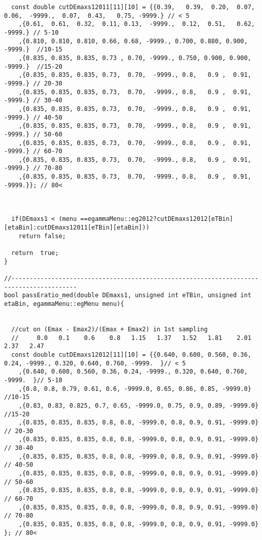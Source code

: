 \begin{lstlisting}
  const double cutDEmaxs12011[11][10] = {{0.39,   0.39,  0.20,  0.07, 0.06,  -9999.,  0.07,  0.43,   0.75, -9999.} // < 5  
	,{0.61,  0.61,  0.32,  0.11, 0.13,  -9999.,  0.12,  0.51,   0.62, -9999.} // 5-10
	,{0.810, 0.810, 0.810, 0.66, 0.68, -9999., 0.700, 0.880, 0.900, -9999.}  //10-15 
	,{0.835, 0.835, 0.835, 0.73 , 0.70, -9999., 0.750, 0.900, 0.900, -9999.}  //15-20 
	,{0.835, 0.835, 0.835, 0.73,  0.70,  -9999., 0.8,   0.9 ,  0.91,  -9999.} // 20-30 
	,{0.835, 0.835, 0.835, 0.73,  0.70,  -9999., 0.8,   0.9 ,  0.91,  -9999.} // 30-40
	,{0.835, 0.835, 0.835, 0.73,  0.70,  -9999., 0.8,   0.9 ,  0.91,  -9999.} // 40-50
	,{0.835, 0.835, 0.835, 0.73,  0.70,  -9999., 0.8,   0.9 ,  0.91,  -9999.} // 50-60 
	,{0.835, 0.835, 0.835, 0.73,  0.70,  -9999., 0.8,   0.9 ,  0.91,  -9999.} // 60-70
	,{0.835, 0.835, 0.835, 0.73,  0.70,  -9999., 0.8,   0.9 ,  0.91,  -9999.} // 70-80
	,{0.835, 0.835, 0.835, 0.73,  0.70,  -9999., 0.8,   0.9 ,  0.91,  -9999.}}; // 80<



  if(DEmaxs1 < (menu ==egammaMenu::eg2012?cutDEmaxs12012[eTBin][etaBin]:cutDEmaxs12011[eTBin][etaBin]))
    return false;
    
  return  true;
}

//----------------------------------------------------------------------------------------
bool passEratio_med(double DEmaxs1, unsigned int eTBin, unsigned int etaBin, egammaMenu::egMenu menu){
  
  
  //cut on (Emax - Emax2)/(Emax + Emax2) in 1st sampling 
  //     0.0   0.1    0.6    0.8   1.15   1.37   1.52   1.81    2.01   2.37   2.47
  const double cutDEmaxs12012[11][10] = {{0.640, 0.600, 0.560, 0.36, 0.24, -9999., 0.320, 0.640, 0.760, -9999.  }// < 5  
	,{0.640, 0.600, 0.560, 0.36, 0.24, -9999., 0.320, 0.640, 0.760, -9999.  }// 5-10
	,{0.8, 0.8, 0.79, 0.61, 0.6, -9999.0, 0.65, 0.86, 0.85, -9999.0}   //10-15
	,{0.83, 0.83, 0.825, 0.7, 0.65, -9999.0, 0.75, 0.9, 0.89, -9999.0} //15-20
	,{0.835, 0.835, 0.835, 0.8, 0.8, -9999.0, 0.8, 0.9, 0.91, -9999.0} // 20-30 
	,{0.835, 0.835, 0.835, 0.8, 0.8, -9999.0, 0.8, 0.9, 0.91, -9999.0} // 30-40
	,{0.835, 0.835, 0.835, 0.8, 0.8, -9999.0, 0.8, 0.9, 0.91, -9999.0} // 40-50
	,{0.835, 0.835, 0.835, 0.8, 0.8, -9999.0, 0.8, 0.9, 0.91, -9999.0} // 50-60 
	,{0.835, 0.835, 0.835, 0.8, 0.8, -9999.0, 0.8, 0.9, 0.91, -9999.0}  // 60-70
	,{0.835, 0.835, 0.835, 0.8, 0.8, -9999.0, 0.8, 0.9, 0.91, -9999.0} // 70-80
	,{0.835, 0.835, 0.835, 0.8, 0.8, -9999.0, 0.8, 0.9, 0.91, -9999.0} }; // 80<


\end{lstlisting}
